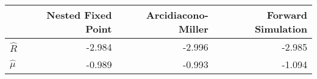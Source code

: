 \begin{tabular}{l|rrr} & Nested Fixed Point & Arcidiacono-Miller & Forward Simulation\\\hline
$\hat{R}$ & -2.984 & -2.996 & -2.985 \\
$\hat{\mu}$ & -0.989 & -0.993 & -1.094 \\
\end{tabular}